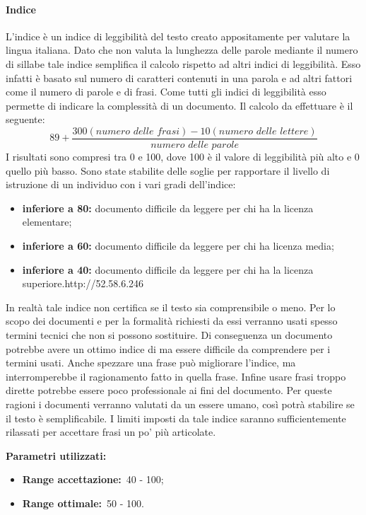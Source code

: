 			\paragraph{Indice }
				\label{sec:3.7.2.1}
				L'indice  è un indice di leggibilità del testo creato appositamente per valutare la lingua italiana. Dato che non valuta la lunghezza delle parole mediante il numero di sillabe tale indice semplifica il calcolo rispetto ad altri indici di leggibilità. Esso infatti è basato sul numero di caratteri contenuti in una parola e ad altri fattori come il numero di parole e di frasi. Come tutti gli indici di leggibilità esso permette di indicare la complessità di un documento. Il calcolo da effettuare è il seguente:
				\[89+\frac{300(numero\,\, delle\,\, frasi) - 10(numero\,\, delle\,\, lettere)}{numero\,\, delle\,\, parole}\]
				I risultati sono compresi tra 0 e 100, dove 100 è il valore di leggibilità più alto e 0 quello più basso. Sono state stabilite delle soglie per rapportare il livello di istruzione di un individuo con i vari gradi dell'indice:
				\begin{itemize}
					\item \textbf{inferiore a 80:} documento difficile da leggere per chi ha la licenza elementare;
					\item \textbf{inferiore a 60:} documento difficile da leggere per chi ha licenza media;
					\item \textbf{inferiore a 40:} documento difficile da leggere per chi ha la licenza superiore.http://52.58.6.246
				\end{itemize}
				In realtà tale indice non certifica se il testo sia comprensibile o meno. Per lo scopo dei documenti e per la formalità richiesti da essi verranno usati spesso termini tecnici che non si possono sostituire. Di conseguenza un documento potrebbe avere un ottimo indice di  ma essere difficile da comprendere per i termini usati. Anche spezzare una frase può migliorare l'indice, ma interromperebbe il ragionamento fatto in quella frase. Infine usare frasi troppo dirette potrebbe essere poco professionale ai fini del documento. Per queste ragioni i documenti verranno valutati da un essere umano, così potrà stabilire se il testo è semplificabile. I limiti imposti da tale indice saranno sufficientemente rilassati per accettare frasi un po' più articolate.
				
				\textbf{Parametri utilizzati:}
				\begin{itemize}
					\item \textbf{Range accettazione:}\ 40 - 100;
					\item \textbf{Range ottimale:}\ 50 - 100.
				\end{itemize}
